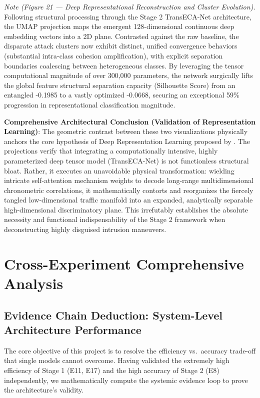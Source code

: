 \documentclass[sigconf]{acmart}
\begin{document}
\textit{Note (Figure 21 --- Deep Representational Reconstruction and Cluster Evolution).} Following structural processing through the Stage 2 TransECA-Net architecture, the UMAP projection maps the emergent 128-dimensional continuous deep embedding vectors into a 2D plane. Contrasted against the raw baseline, the disparate attack clusters now exhibit distinct, unified convergence behaviors (substantial intra-class cohesion amplification), with explicit separation boundaries coalescing between heterogeneous classes. By leveraging the tensor computational magnitude of over 300,000 parameters, the network surgically lifts the global feature structural separation capacity (Silhouette Score) from an entangled -0.1985 to a vastly optimized -0.0668, securing an exceptional 59\% progression in representational classification magnitude.

\textbf{Comprehensive Architectural Conclusion (Validation of Representation Learning)}: The geometric contrast between these two visualizations physically anchors the core hypothesis of Deep Representation Learning proposed by \cite{5}. The projections verify that integrating a computationally intensive, highly parameterized deep tensor model (TransECA-Net) is not functionless structural bloat. Rather, it executes an unavoidable physical transformation: wielding intricate self-attention mechanism weights to decode long-range multidimensional chronometric correlations, it mathematically contorts and reorganizes the fiercely tangled low-dimensional traffic manifold into an expanded, analytically separable high-dimensional discriminatory plane. This irrefutably establishes the absolute necessity and functional indispensability of the Stage 2 framework when deconstructing highly disguised intrusion maneuvers.

\section{Cross-Experiment Comprehensive Analysis}

\subsection{Evidence Chain Deduction: System-Level Architecture Performance}

The core objective of this project is to resolve the efficiency vs.\ accuracy trade-off that single models cannot overcome. Having validated the extremely high efficiency of Stage 1 (E11, E17) and the high accuracy of Stage 2 (E8) independently, we mathematically compute the systemic evidence loop to prove the architecture's validity.
\end{document}
